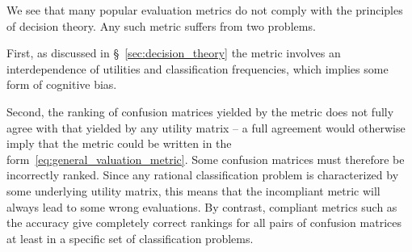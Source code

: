 \documentclass[\ifafour a4paper,12pt,\else a5paper,10pt,\fi%
onecolumn,oneside,article,%
british%
]{memoir}
\theoremstyle{remark}
\theoremstyle{innote}
\renewcommand*{\|}[1][]{\nonscript\:#1\vert\nonscript\:\mathopen{}}
\newcommand*{\sect}{\S}%
\begin{document}
We see that many popular evaluation metrics do not comply with the principles of decision theory. Any such metric suffers from two problems.

First, as discussed in \sect~\ref{sec:decision_theory} the metric involves an interdependence of utilities and classification frequencies, which implies some form of cognitive bias\autocites[discuss such biases in regard to the $F_{1}$-measure]{handetal2018}.

Second, the ranking of confusion matrices yielded by the metric does not fully agree with that yielded by any utility matrix -- a full agreement would otherwise imply that the metric could be written in the form~\eqref{eq:general_valuation_metric}. Some confusion matrices must therefore be incorrectly ranked. Since any rational classification problem is characterized by some underlying utility matrix, this means that the incompliant metric will always lead to some wrong evaluations. By contrast, compliant metrics such as the accuracy give completely correct rankings for all pairs of confusion matrices at least in a specific set of classification problems.
\end{document}
